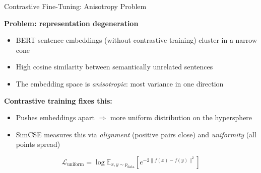 \documentclass[11pt,compress,t,notes=noshow, xcolor=table]{beamer}
\begin{document}
\begin{frame}{Contrastive Fine-Tuning: Anisotropy Problem}

\vfill

\textbf{Problem: representation degeneration} 

\begin{itemize}
  \item BERT sentence embeddings (without contrastive training) cluster in a narrow cone
  \item High cosine similarity between semantically unrelated sentences
  \item The embedding space is \textit{anisotropic}: most variance in one direction
\end{itemize}

\vfill

\textbf{Contrastive training fixes this:}
\begin{itemize}
  \item Pushes embeddings apart $\Rightarrow$ more uniform distribution on the hypersphere
  \item SimCSE measures this via \textit{alignment} (positive pairs close) and \textit{uniformity} (all points spread)
\end{itemize}

$$\mathcal{L}_\text{uniform} = \log \mathbb{E}_{x, y \sim p_\text{data}}\left[e^{-2\|f(x) - f(y)\|^2}\right]$$

\vfill

\end{frame}

\end{document}
